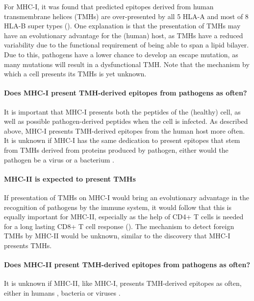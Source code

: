 For MHC-I, it was found that predicted epitopes derived 
from human transmembrane helices (TMHs)
are over-presented by all 5 HLA-A and 
most of 8 HLA-B super types (\cite{bianchi2017}).
One explanation is that the presentation of TMHs 
may have an evolutionary advantage for 
the (human) host, as TMHs have a reduced variability 
due to the functional requirement of being able to span a lipid bilayer. 
Due to this, pathogens have a lower chance to develop an escape mutation,
as many mutations will result in a dysfunctional TMH.
Note that the mechanism by which a cell presents its TMHs is
yet unknown.

\paragraph{Does MHC-I present TMH-derived epitopes from pathogens as often?}

It is important that MHC-I presents both the peptides of the 
(healthy) cell, as well as possible pathogen-derived peptides when the
cell is infected. As described above, MHC-I presents TMH-derived epitopes 
from the human host more often. It is unknown if MHC-I has the same
dedication to present epitopes that stem from TMHs derived from
proteins produced by pathogen, either would the pathogen
be a virus  or 
a bacterium .

\paragraph{MHC-II is expected to present TMHs}

If presentation of TMHs on MHC-I would bring an evolutionary advantage 
in the recognition of pathogens by the immune system, 
it would follow that this is equally important for MHC-II, 
especially as the help of CD4+ T cells is needed for a long lasting CD8+ T cell 
response (\cite{novy2007cd4}). 
The mechanism to detect foreign TMHs by MHC-II would be unknown, 
similar to the discovery that MHC-I presents TMHs.

\paragraph{Does MHC-II present TMH-derived epitopes from pathogens as often?}

It is unknown if MHC-II, like MHC-I, 
presents TMH-derived epitopes as often, either 
in humans ,
bacteria 
or viruses .

